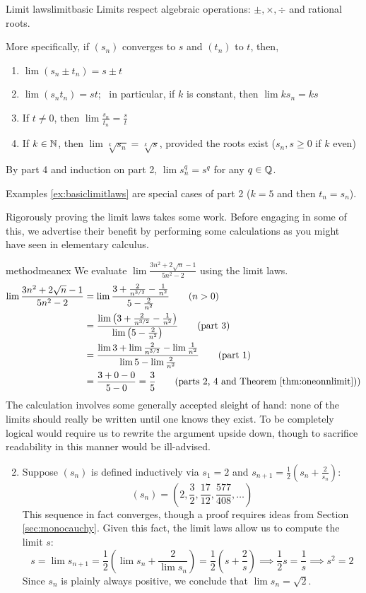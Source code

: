 \begin{thm}{Limit laws}{limitbasic}
	Limits respect algebraic operations: $\pm, \times,\div$ and rational roots.\par
	More specifically, if $(s_n)$ converges to $s$ and $(t_n)$ to $t$, then,
	\begin{enumerate}\itemsep2pt
		\item $\lim (s_n\pm t_n)=s\pm t$
		\item $\lim(s_nt_n)=st$; \ in particular, if $k$ is constant, then $\lim ks_n=ks$
		\item If $t\neq 0$, then $\lim \frac{s_n}{t_n}=\frac st$
		\item If $k\in\mathbb{N}$, then $\lim \sqrt[k]{s_n}=\sqrt[k]{s}$, provided the roots exist ($s_n,s\ge 0$ if $k$ even)
	\end{enumerate}
	By part 4 and induction on part 2, $\lim s_n^q=s^q$ for any $q\in\mathbb{Q}$.
\end{thm}

Examples \ref{ex:basiclimitlaws} are special cases of part 2 ($k=5$ and then $t_n=s_n$). 
\goodbreak

Rigorously proving the limit laws takes some work. Before engaging in some of this, we advertise their benefit by performing some calculations as you might have seen in elementary calculus.

\begin{examples}{}{methodmeanex}
	\exstart We evaluate $\lim\frac{3n^2+2\sqrt n-1}{5n^2-2}$ using the limit laws.
	\begin{align*}
		\lim\frac{3n^2+2\sqrt n-1}{5n^2-2}&=\lim\frac{3+\frac 2{n^{3/2}}-\frac 1{n^2}}{5-\frac 2{n^2}} \tag{$n>0$}\\
		&=\frac{\lim\left(3+\frac 2{n^{3/2}}-\frac 1{n^2}\right)}{\lim\left(5-\frac 2{n^2}\right)}\tag{part 3}\\
		&=\frac{\lim 3+\lim\frac 2{n^{3/2}}-\lim\frac 1{n^2}}{\lim 5-\lim\frac 2{n^2}}\tag{part 1}\\
		&=\frac{3+0-0}{5-0}=\frac 35\tag*{(parts 2, 4 and Theorem \ref{thm:oneonnlimit}))}
	\end{align*}
	The calculation involves some generally accepted sleight of hand: none of the limits should really be written until one knows they exist. To be completely logical would require us to rewrite the argument upside down, though to sacrifice readability in this manner would be ill-advised.


	\begin{enumerate}\setcounter{enumi}{1}
	  \item\label{ex:methodmeanex2} Suppose $(s_n)$ is defined inductively via $s_1=2$ and $s_{n+1}=\frac 12(s_n+\frac 2{s_n})$:
		\[
			(s_n)=\left(2,\frac 32,\frac{17}{12},\frac{577}{408},\ldots\right)
		\]
		This sequence in fact converges, though a proof requires ideas from Section \ref{sec:monocauchy}. Given this fact, the limit laws allow us to compute the limit $s$:
		\[
			s=\lim s_{n+1}=\frac 12\left(\lim s_n+\frac 2{\lim s_n}\right) 
			=\frac 12\left(s+\frac 2s\right) 
			\implies \frac 12s=\frac 1s\implies s^2=2
		\]
		Since $s_n$ is plainly always positive, we conclude that $\lim s_n=\sqrt 2$.
	\end{enumerate}
\end{examples}

